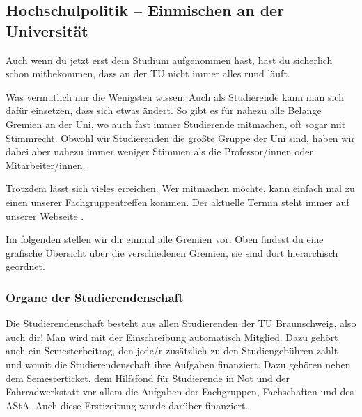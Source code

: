 
\subsection{Hochschulpolitik -- Einmischen an der Universität}

Auch wenn du jetzt erst dein Studium aufgenommen hast, hast du sicherlich schon mitbekommen, dass an der TU nicht immer alles rund läuft.

Was vermutlich nur die Wenigsten wissen: Auch als Studierende kann man sich dafür einsetzen, dass sich etwas ändert. So gibt es für nahezu alle Belange Gremien an der Uni, wo auch fast immer Studierende mitmachen, oft sogar mit Stimmrecht. Obwohl wir Studierenden die größte Gruppe der Uni sind, haben wir dabei aber nahezu immer
weniger Stimmen als die Professor/innen oder Mitarbeiter/innen. 

Trotzdem lässt sich vieles erreichen. Wer mitmachen möchte, kann einfach mal zu einen unserer Fachgruppentreffen kommen. Der aktuelle Termin steht immer auf unserer Webseite \fginfoUrl.

Im folgenden stellen wir dir einmal alle Gremien vor. Oben findest du eine grafische Übersicht über die verschiedenen Gremien, sie sind dort hierarchisch geordnet.

\subsubsection*{Organe der Studierendenschaft}

Die Studierendenschaft besteht aus allen Studierenden der TU Braunschweig, also auch dir!
Man wird mit der Einschreibung automatisch Mitglied. Dazu gehört auch ein Semesterbeitrag, den jede/r 
zusätzlich zu den Studiengebühren zahlt und womit die Studierendenschaft ihre Aufgaben finanziert. 
Dazu gehören neben dem Semesterticket, dem Hilfsfond für Studierende in Not und der 
Fahrradwerkstatt vor allem die Aufgaben der Fachgruppen, Fachschaften und des AStA. Auch diese
Erstizeitung wurde darüber finanziert.


